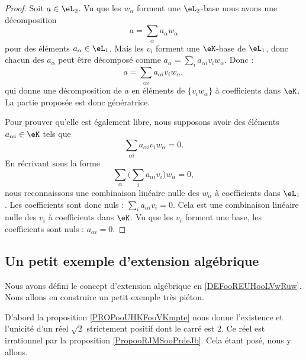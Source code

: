 \begin{proof}
    Soit \( a\in \eL_2\). Vu que les \( w_{\alpha}\) forment une \( \eL_2\)-base nous avons une décomposition
    \begin{equation}
        a=\sum_{\alpha}a_{\alpha}w_{\alpha}
    \end{equation}
    pour des éléments \( a_{\alpha}\in \eL_1\). Mais les \( v_i\) forment une \( \eK\)-base de \( \eL_1\), donc chacun des \( a_{\alpha}\) peut être décomposé comme \( a_{\alpha}=\sum_ia_{\alpha i}v_iw_{\alpha}\). Donc :
    \begin{equation}
        a=\sum_{\alpha i}a_{\alpha i}v_iw_{\alpha},
    \end{equation}
    qui donne une décomposition de \( a\) en éléments de \( \{ v_iw_{\alpha} \}\) à coefficients dans \( \eK\). La partie proposée est donc génératrice.

    Pour prouver qu'elle est également libre, nous supposons avoir des éléments \( a_{\alpha i}\in \eK\) tels que
    \begin{equation}
        \sum_{\alpha i}a_{\alpha i}v_iw_{\alpha}=0.
    \end{equation}
    En récrivant sous la forme
    \begin{equation}
        \sum_{\alpha}\Big( \sum_ia_{\alpha i}v_i \Big)w_{\alpha}=0,
    \end{equation}
    nous reconnaissons une combinaison linéaire nulle des \( w_{\alpha}\) à coefficients dans \( \eL_1\). Les coefficients sont donc nuls : \( \sum_i a_{\alpha i}v_i=0\). Cela est une combinaison linéaire nulle des \( v_i\) à coefficients dans \( \eK\). Vu que les \( v_i\) forment une base, les coefficients sont nuls : \( a_{\alpha i}=0\).
\end{proof}

\subsection{Un petit exemple d'extension algébrique}

Nous avons défini le concept d'extension algébrique en \ref{DEFooREUHooLVwRuw}. Nous allons en construire un petit exemple très piéton.

D'abord la proposition \ref{PROPooUHKFooVKmpte} nous donne l'existence et l'unicité d'un réel \( \sqrt{ 2 }\) strictement positif dont le carré est \( 2\). Ce réel est irrationnel par la proposition \ref{PropooRJMSooPrdeJb}. Cela étant posé, nous y allons.

